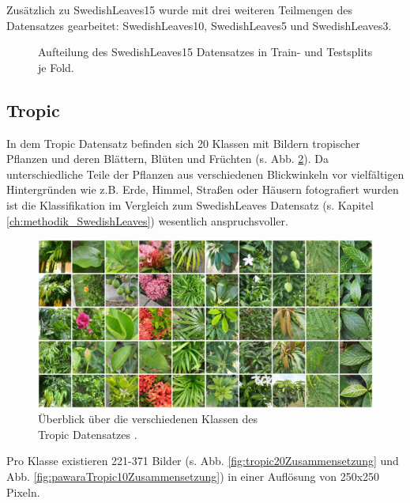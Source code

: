 Zusätzlich zu SwedishLeaves15 wurde mit drei weiteren Teilmengen des Datensatzes gearbeitet: SwedishLeaves10, SwedishLeaves5 und SwedishLeaves3.

\begin{figure}[H]
\begin{adjustbox}{width=1.4\textwidth, center}

\end{adjustbox}
\caption{Aufteilung des SwedishLeaves15 Datensatzes \cite{swedishLeaves} in Train- und Testsplits je Fold.}
\label{fig:swedishLeavesZusammensetzung}
\end{figure}

\subsection{Tropic}
In dem Tropic Datensatz \cite{pawaraWebsiteDatensaetze} befinden sich 20 Klassen mit Bildern tropischer Pflanzen und deren Blättern, Blüten und Früchten (s. Abb. \ref{fig:tropicUeberblick}). Da unterschiedliche Teile der Pflanzen aus verschiedenen Blickwinkeln vor vielfältigen Hintergründen wie z.B. Erde, Himmel, Straßen oder Häusern fotografiert wurden ist die Klassifikation im Vergleich zum SwedishLeaves Datensatz \cite{swedishLeaves} (s. Kapitel \ref{ch:methodik_SwedishLeaves}) wesentlich anspruchsvoller.


\begin{figure}[H]
\centering
\includegraphics[scale=0.14]{img/2_tropic10-image.jpg}
\caption{Überblick über die verschiedenen Klassen des\\
Tropic Datensatzes \cite{pawaraTropic}.}
\label{fig:tropicUeberblick}
\end{figure}

Pro Klasse existieren 221-371 Bilder (s. Abb. \ref{fig:tropic20Zusammensetzung} und Abb. \ref{fig:pawaraTropic10Zusammensetzung}) in einer Auflösung von 250x250 Pixeln.

